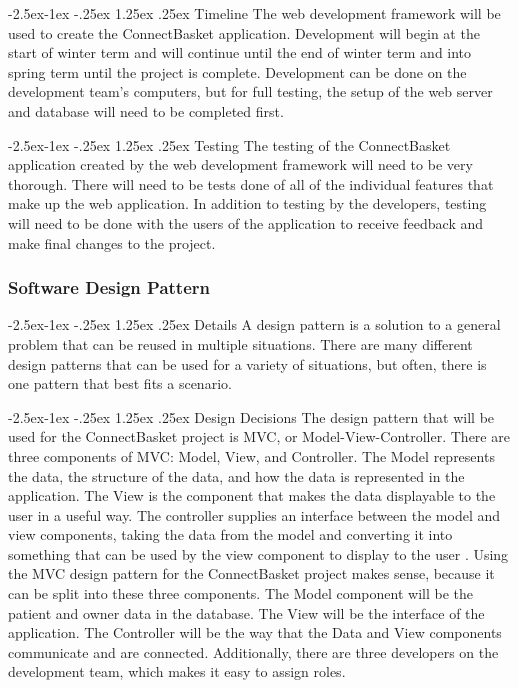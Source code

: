 \documentclass[onecolumn, draftclsnofoot,10pt, compsoc]{IEEEtran}
\makeatletter
\renewcommand\paragraph{\@startsection{paragraph}{4}{\z@}%
            {-2.5ex\@plus -1ex \@minus -.25ex}%
            {1.25ex \@plus .25ex}%
            {\normalfont\normalsize\bfseries}}
\makeatother
\begin{document}
\paragraph{Timeline}
The web development framework will be used to create the ConnectBasket application. Development will begin at the start of winter term and will continue until the end of winter term and into spring term until the project is complete. Development can be done on the development team’s computers, but for full testing, the setup of the web server and database will need to be completed first.


\paragraph{Testing}
The testing of the ConnectBasket application created by the web development framework will need to be very thorough. There will need to be tests done of all of the individual features that make up the web application. In addition to testing by the developers, testing will need to be done with the users of the application to receive feedback and make final changes to the project.


\subsubsection{Software Design Pattern}

\paragraph{Details}
A design pattern is a solution to a general problem that can be reused in multiple situations. There are many different design patterns that can be used for a variety of situations, but often, there is one pattern that best fits a scenario.  


\paragraph{Design Decisions}
The design pattern that will be used for the ConnectBasket project is MVC, or Model-View-Controller. There are three components of MVC: Model, View, and Controller. The Model represents the data, the structure of the data, and how the data is represented in the application. The View is the component that makes the data displayable to the user in a useful way. The controller supplies an interface between the model and view components, taking the data from the model and converting it into something that can be used by the view component to display to the user \cite{mvc}. Using the MVC design pattern for the ConnectBasket project makes sense, because it can be split into these three components. The Model component will be the patient and owner data in the database. The View will be the interface of the application. The Controller will be the way that the Data and View components communicate and are connected. Additionally, there are three developers on the development team, which makes it easy to assign roles. 
\end{document}

